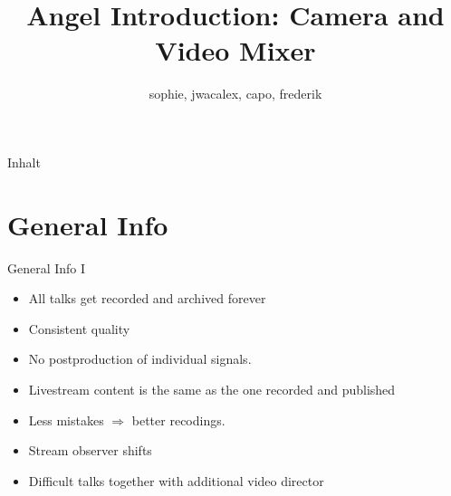 \documentclass[aspectratio=169]{beamer}
\title{Angel Introduction: Camera and Video Mixer}
\author{sophie, jwacalex, capo, frederik}
\institute{C3VOC}
\begin{document}

\maketitle

\begin{frame}{Inhalt}
\tableofcontents
\end{frame}


\newpage





\section{General Info}
\begin{frame}{General Info I}
	\begin{itemize}
		\item All talks get recorded and archived forever
		\item Consistent quality
		\item No postproduction of individual signals.
		\item Livestream content is the same as the one recorded and published
		\item Less mistakes $\Rightarrow$ better recodings.
		\item Stream observer shifts
		\item Difficult talks together with additional video director
	\end{itemize}
\end{frame}
\end{document}
